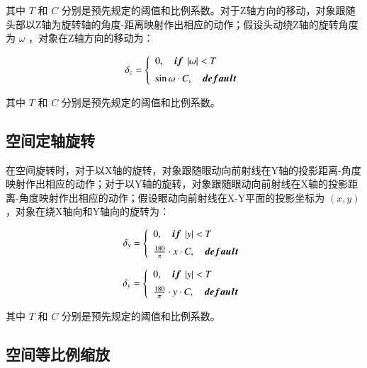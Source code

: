 其中 $T$ 和 $C$ 分别是预先规定的阈值和比例系数。对于Z轴方向的移动，对象跟随头部以Z轴为旋转轴的角度-距离映射作出相应的动作；假设头动绕Z轴的旋转角度为 $\omega$ ，对象在Z轴方向的移动为：

\begin{equation}
	\label{formula-3-4}
	\delta_z = 
    \left\{
    \begin{array}{l}
        0, \quad {\mbox{\boldmath $if$}}\ \left|\omega\right| < T \\ [0.2cm]
        \sin{\omega} \cdot C,\quad {\mbox{\boldmath $default$}}
    \end{array}
    \right.
\end{equation}

其中 $T$ 和 $C$ 分别是预先规定的阈值和比例系数。

\subsection{空间定轴旋转}

在空间旋转时，对于以X轴的旋转，对象跟随眼动向前射线在Y轴的投影距离-角度映射作出相应的动作；对于以Y轴的旋转，对象跟随眼动向前射线在X轴的投影距离-角度映射作出相应的动作；假设眼动向前射线在X-Y平面的投影坐标为 $(x, y)$ ，对象在绕X轴向和Y轴向的旋转为：

\begin{equation}
	\label{formula-3-5}
	\delta_y = 
    \left\{
    \begin{array}{l}
        0, \quad {\mbox{\boldmath $if$}}\ \left|y\right| < T \\ [0.2cm]
        \frac{180}{\pi} \cdot x \cdot C,\quad {\mbox{\boldmath $default$}}
    \end{array}
    \right.
\end{equation}
 
\begin{equation}
	\label{formula-3-6}
	\delta_y = 
    \left\{
    \begin{array}{l}
        0, \quad {\mbox{\boldmath $if$}}\ \left|y\right| < T \\ [0.2cm]
        \frac{180}{\pi} \cdot y \cdot C,\quad {\mbox{\boldmath $default$}}
    \end{array}
    \right.
\end{equation}

其中 $T$ 和 $C$ 分别是预先规定的阈值和比例系数。

\subsection{空间等比例缩放}

